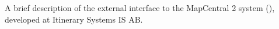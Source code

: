 % 
% 
% 
% 
% 
%  





  \newcommand{\documentName}{Summary of the XML API}
  \newcommand{\documentCode}{}

  \newcommand{\version}{Rev. 0.1}





   \renewcommand{\printtableofcontents}{false}


   \renewcommand\createtitlepage{false}





A brief description of the external interface to the MapCentral 2
system (\mc), developed at Itinerary Systems IS AB. 





